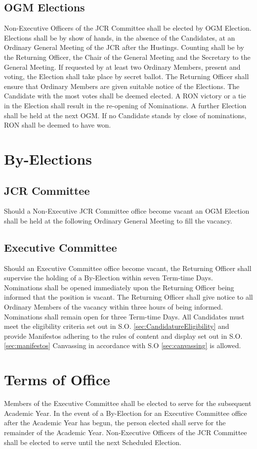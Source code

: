 \subsection{OGM Elections} \label{ssec:OGMElections}
\npara Non-Executive Officers of the JCR Committee shall be elected by OGM Election.
\npara Elections shall be by show of hands, in the absence of the Candidates, at an Ordinary General Meeting of the JCR after the Hustings. Counting shall be by the Returning Officer, the Chair of the General Meeting and the Secretary to the General Meeting. If requested by at least two Ordinary Members, present and voting, the Election shall take place by secret ballot.
\npara The Returning Officer shall ensure that Ordinary Members are given suitable notice of the Elections.
\npara The Candidate with the most votes shall be deemed elected.
\npara A RON victory or a tie in the Election shall result in the re-opening of Nominations. A further Election shall be held at the next OGM.
\npara If no Candidate stands by close of nominations, RON shall be deemed to have won.
\section{By-Elections}
\subsection{JCR Committee}
\npara Should a Non-Executive JCR Committee office become vacant an OGM Election shall be held at the following Ordinary General Meeting to fill the vacancy.
\subsection{Executive Committee}
\npara Should an Executive Committee office become vacant, the Returning Officer shall supervise the holding of a By-Election within seven Term-time Days.
\npara Nominations shall be opened immediately upon the Returning Officer being informed that the position is vacant. The Returning Officer shall give notice to all Ordinary Members of the vacancy within three hours of being informed. Nominations shall remain open for three Term-time Days.
\npara All Candidates must meet the eligibility criteria set out in S.O. \ref{sec:CandidatureEligibility} and provide Manifestos adhering to the rules of content and display set out in S.O. \ref{sec:manifestos} Canvassing in accordance with S.O \ref{sec:canvassing} is allowed.
\section{Terms of Office}
\npara Members of the Executive Committee shall be elected to serve for the subsequent Academic Year.  In the event of a By-Election for an Executive Committee office after the Academic Year has begun, the person elected shall serve for the remainder of the Academic Year.
\npara Non-Executive Officers of the JCR Committee shall be elected to serve until the next Scheduled Election.
